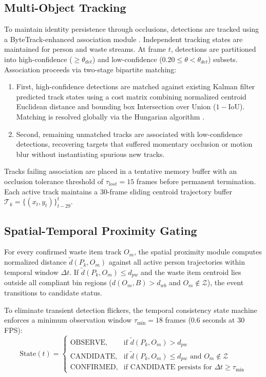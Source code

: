 \documentclass[conference]{IEEEtran}
\begin{document}
\subsection{Multi-Object Tracking}

To maintain identity persistence through occlusions, detections are tracked using a ByteTrack-enhanced association module \cite{b22}. Independent tracking states are maintained for person and waste streams. At frame $t$, detections are partitioned into high-confidence ($\geq \theta_{det}$) and low-confidence ($0.20 \leq \theta < \theta_{det}$) subsets. Association proceeds via two-stage bipartite matching:
\begin{enumerate}
\item First, high-confidence detections are matched against existing Kalman filter predicted track states using a cost matrix combining normalized centroid Euclidean distance and bounding box Intersection over Union ($1 - \text{IoU}$). Matching is resolved globally via the Hungarian algorithm \cite{b18}.
\item Second, remaining unmatched tracks are associated with low-confidence detections, recovering targets that suffered momentary occlusion or motion blur without instantiating spurious new tracks.
\end{enumerate}
Tracks failing association are placed in a tentative memory buffer with an occlusion tolerance threshold of $\tau_{lost} = 15$ frames before permanent termination. Each active track maintains a 30-frame sliding centroid trajectory buffer $\mathcal{T}_k = \{(x_t, y_t)\}_{t-29}^t$.

\subsection{Spatial-Temporal Proximity Gating}

For every confirmed waste item track $O_m$, the spatial proximity module computes normalized distance $\tilde{d}(P_k, O_m)$ against all active person trajectories within temporal window $\Delta t$. If $\tilde{d}(P_k, O_m) \leq d_{pw}$ and the waste item centroid lies outside all compliant bin regions ($d(O_m, B) > d_{wb}$ and $O_m \notin \mathcal{Z}$), the event transitions to candidate status.

To eliminate transient detection flickers, the temporal consistency state machine enforces a minimum observation window $\tau_{\min} = 18$ frames (0.6 seconds at 30 FPS):
\begin{equation}
\text{State}(t) =
\begin{cases}
\text{OBSERVE},   & \text{if } \tilde{d}(P_k, O_m) > d_{pw} \\
\text{CANDIDATE}, & \text{if } \tilde{d}(P_k, O_m) \leq d_{pw} \text{ and } O_m \notin \mathcal{Z} \\
\text{CONFIRMED}, & \text{if CANDIDATE persists for } \Delta t \geq \tau_{\min}
\end{cases}
\end{equation}
\end{document}
